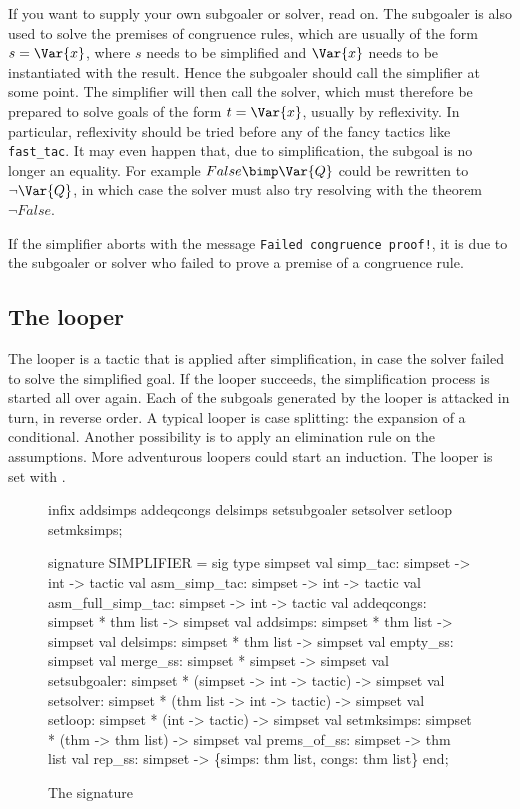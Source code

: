 \begin{warn}
  If you want to supply your own subgoaler or solver, read on.  The subgoaler
  is also used to solve the premises of congruence rules, which are usually
  of the form $s = \Var{x}$, where $s$ needs to be simplified and $\Var{x}$
  needs to be instantiated with the result. Hence the subgoaler should call
  the simplifier at some point. The simplifier will then call the solver,
  which must therefore be prepared to solve goals of the form $t = \Var{x}$,
  usually by reflexivity. In particular, reflexivity should be tried before
  any of the fancy tactics like {\tt fast_tac}. It may even happen that, due
  to simplification, the subgoal is no longer an equality. For example $False
  \bimp \Var{Q}$ could be rewritten to $\neg\Var{Q}$, in which case the
  solver must also try resolving with the theorem $\neg False$.

  If the simplifier aborts with the message {\tt Failed congruence proof!},
  it is due to the subgoaler or solver who failed to prove a premise of a
  congruence rule.
\end{warn}

\subsection{The looper} 
The looper is a tactic that is applied after simplification, in case the
solver failed to solve the simplified goal.  If the looper succeeds, the
simplification process is started all over again.  Each of the subgoals
generated by the looper is attacked in turn, in reverse order.  A
typical looper is case splitting: the expansion of a conditional.  Another
possibility is to apply an elimination rule on the assumptions.  More
adventurous loopers could start an induction.  The looper is set with 
.


\begin{figure}
\begin{ttbox}
infix addsimps addeqcongs delsimps
      setsubgoaler setsolver setloop setmksimps;

signature SIMPLIFIER =
sig
  type simpset
  val simp_tac:          simpset -> int -> tactic
  val asm_simp_tac:      simpset -> int -> tactic
  val asm_full_simp_tac: simpset -> int -> tactic\smallskip
  val addeqcongs:   simpset * thm list -> simpset
  val addsimps:     simpset * thm list -> simpset
  val delsimps:     simpset * thm list -> simpset
  val empty_ss:     simpset
  val merge_ss:     simpset * simpset -> simpset
  val setsubgoaler: simpset * (simpset -> int -> tactic) -> simpset
  val setsolver:    simpset * (thm list -> int -> tactic) -> simpset
  val setloop:      simpset * (int -> tactic) -> simpset
  val setmksimps:   simpset * (thm -> thm list) -> simpset
  val prems_of_ss:  simpset -> thm list
  val rep_ss:       simpset -> \{simps: thm list, congs: thm list\}
end;
\end{ttbox}
\caption{The signature } \label{SIMPLIFIER}
\end{figure}


